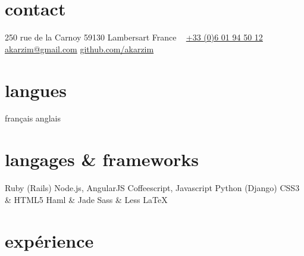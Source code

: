 \documentclass[print]{cv} %
\begin{document}


\begin{aside} %
\section{contact}
\faHome{} 250 rue de la Carnoy
59130 Lambersart
France
~
\faPhone{} \href{tel:003360194501}{+33 (0)6 01 94 50 12}
~
\faEnvelope{} \href{mailto:akarzim@gmail.com}{akarzim@gmail.com}
\faGithub{} \href{https://github.com/akarzim}{github.com/akarzim}
\section{langues}
français
anglais
\section{langages \& frameworks}
{\color{red} \faStar} Ruby (Rails)
Node.js, AngularJS
Coffeescript, Javascript
Python (Django)
CSS3 \& HTML5
Haml \& Jade
Sass \& Less
\LaTeX{}
\end{aside}

\section{expérience}
\end{document}
